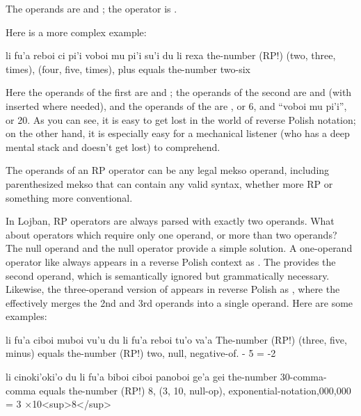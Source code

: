 The operands are  and ; the operator is
    .

Here is a more complex example:
\begin{example}
li fu'a reboi ci pi'i\n
\T	voboi mu pi'i su'i\n
\T	du li rexa\n
the-number (RP!) (two, three, times),\n
\T	(four, five, times), plus\n
\T	equals the-number two-six
\end{example}

Here the operands of the first  are  and
    ; the operands of the second  are  and
     (with  inserted where needed), and the operands
    of the  are , or 6, and ``voboi mu
    pi'i'', or 20. As you can see, it is easy to get lost in the
    world of reverse Polish notation; on the other hand, it is
    especially easy for a mechanical listener (who has a deep
    mental stack and doesn't get lost) to comprehend.

The operands of an RP operator can be any legal mekso
    operand, including parenthesized mekso that can contain any
    valid syntax, whether more RP or something more
    conventional.

In Lojban, RP operators are always parsed with exactly two
    operands. What about operators which require only one operand,
    or more than two operands? The null operand  and the
    null operator  provide a simple solution. A one-operand
    operator like  always appears in a reverse Polish
    context as . The  provides the second
    operand, which is semantically ignored but grammatically
    necessary. Likewise, the three-operand version of 
    appears in reverse Polish as , where the 
    effectively merges the 2nd and 3rd operands into a single
    operand. Here are some examples:
\begin{example}
li fu'a ciboi muboi vu'u\n
\T	du li fu'a reboi tu'o va'a\n
The-number (RP!) (three, five, minus)\n
\T	equals the-number (RP!) two, null, negative-of. - 5 = -2
\end{example}

\begin{example}
li cinoki'oki'o du\n
\T	li fu'a biboi\n
\T	ciboi panoboi ge'a gei\n
the-number 30-comma-comma equals\n
\T	the-number (RP!) 8,\n
\T	(3, 10, null-op), exponential-notation,000,000 = 3 $\times$10<sup>8</sup>
\end{example}



